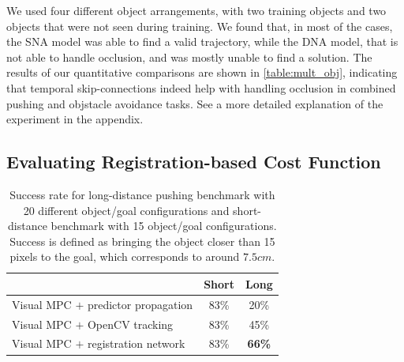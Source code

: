 We used four different object arrangements, with two training objects and two objects that were not seen during training. We found that, in most of the cases, the SNA model was able to find a valid trajectory, while the DNA model, that is not able to handle occlusion, and was mostly unable to find a solution. The results of our quantitative comparisons are shown in \autoref{table:mult_obj}, indicating that temporal skip-connections indeed help with handling occlusion in combined pushing and objstacle avoidance tasks. See a more detailed explanation of the experiment in the appendix.



\subsection{Evaluating Registration-based Cost Function}
\label{susbsec:reg_cost_exp}

\begin{table}
	{\footnotesize
		\begin{center}
			\begin{tabular}{lcc}
				\toprule
				& Short & Long \\
				\midrule
				Visual MPC $+$ predictor propagation  & 83\% & 20\% \\
				Visual MPC $+$ OpenCV tracking  & 83\%  & 45\% \\
				Visual MPC $+$ registration network & 83\% & \textbf{66\%}  \\
				\bottomrule
			\end{tabular}
		\end{center}
	}
	\caption{\small Success rate for long-distance pushing benchmark with 20 different object/goal configurations and short-distance benchmark with 15 object/goal configurations. Success is defined as bringing the object closer than 15 pixels to the goal, which corresponds to around $7.5cm$.}
	\label{table:res_long_short}
\end{table}


